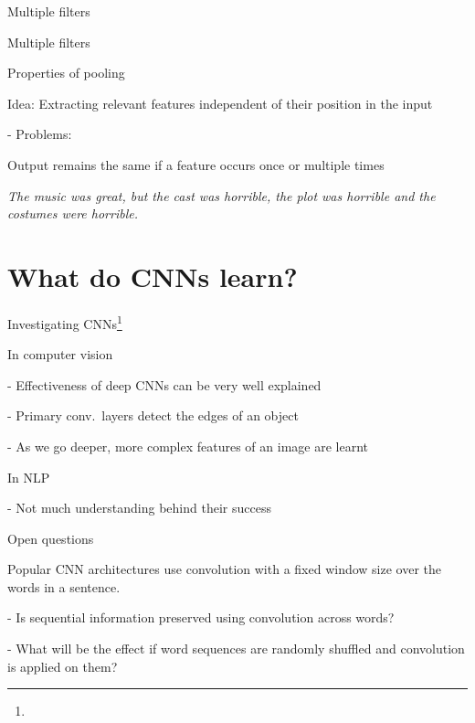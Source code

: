 \documentclass[12pt]{beamer}
\begin{document}
\begin{frame}{Multiple filters}
	
\scalebox{0.95}{
	\hspace{-1.5cm}
}
	
	
\end{frame}

\begin{frame}{Multiple filters}
	
	\scalebox{0.95}{
		\hspace{-1.5cm}
	}
	
	
\end{frame}


\begin{frame}{Properties of pooling}
	
Idea: Extracting relevant features independent of their position in the input
	
- Problems:

Output remains the same if a feature occurs once or multiple times


\emph{The music was great, but the cast was horrible, the plot was horrible and the costumes were horrible.}	
\end{frame}


\section{What do CNNs learn?}


\begin{frame}{Investigating CNNs\footnote{}}

In computer vision

- Effectiveness of deep CNNs can be very well explained

- Primary conv.\ layers detect the edges of an object

- As we go deeper, more complex features of an image are learnt


In NLP

- Not much understanding behind their success


\end{frame}


\begin{frame}{Open questions}
	
Popular CNN architectures use convolution with a fixed window size over the words in a sentence.
	
	
- Is sequential information preserved using convolution across words?

- What will be the effect if word sequences are randomly shuffled and convolution is applied on them?
	
\end{frame}
\end{document}
